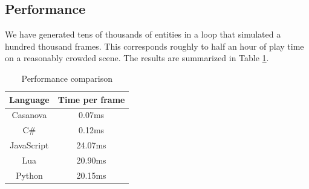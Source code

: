
\subsection{Performance}
We have generated tens of thousands of entities in a loop that simulated a hundred thousand frames. This corresponds roughly to half an hour of play time on a reasonably crowded scene. The results are summarized in Table \ref{Performance comparison - Time per frame}.

\begin{table}[!t]
\caption{Performance comparison}
\label{Performance comparison - Time per frame}
\centering
\begin{tabular}{|c||c|}
\hline
Language & Time per frame\\
\hline
Casanova & 0.07ms\\
\hline
C\# & 0.12ms\\
\hline
JavaScript & 24.07ms \\
\hline
Lua & 20.90ms\\
\hline
Python & 20.15ms \\
\hline
\end{tabular}
\end{table}

